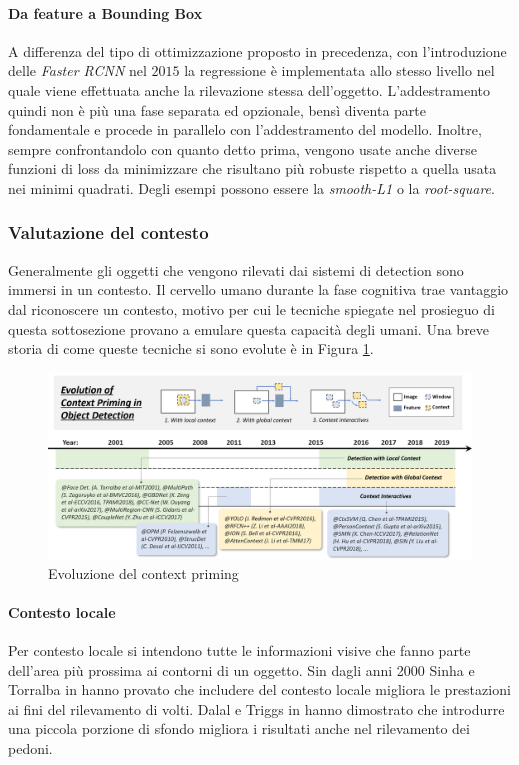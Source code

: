 \paragraph{Da feature a Bounding Box}
A differenza del tipo di ottimizzazione proposto in precedenza, con l'introduzione delle \textit{Faster RCNN} \cite{ren2015faster} nel $2015$ la regressione è implementata allo stesso livello nel quale viene effettuata anche la rilevazione stessa dell'oggetto. L'addestramento quindi non è più una fase separata ed opzionale, bensì diventa parte fondamentale e procede in parallelo con l'addestramento del modello.  Inoltre, sempre confrontandolo con quanto detto prima, vengono usate anche diverse funzioni di loss da minimizzare che risultano più robuste rispetto a quella usata nei minimi quadrati. Degli esempi possono essere la \textit{smooth-L1} o la \textit{root-square}.

\subsubsection{Valutazione del contesto}
Generalmente gli oggetti che vengono rilevati dai sistemi di detection sono immersi in un contesto. Il cervello umano durante la fase cognitiva trae vantaggio dal riconoscere un contesto, motivo per cui le tecniche spiegate nel prosieguo di questa sottosezione provano a emulare questa capacità degli umani. Una breve storia di come queste tecniche si sono evolute è in Figura \ref{fig:context_history}.
\begin{figure}
    \centering
    \includegraphics[width=\textwidth]{images/evol-context.png}
    \caption{Evoluzione del context priming \cite{DBLP:journals/corr/abs-1905-05055}}
    \label{fig:context_history}
\end{figure}
\paragraph{Contesto locale}
Per contesto locale si intendono tutte le informazioni visive che fanno parte dell'area più prossima ai contorni di un oggetto. Sin dagli anni 2000 Sinha e Torralba in \cite{torralba2001detecting} hanno provato che includere del contesto locale migliora le prestazioni ai fini del rilevamento di volti. Dalal e Triggs in \cite{dalal2005histograms} hanno dimostrato che introdurre una piccola porzione di sfondo migliora i risultati anche nel rilevamento dei pedoni. 
